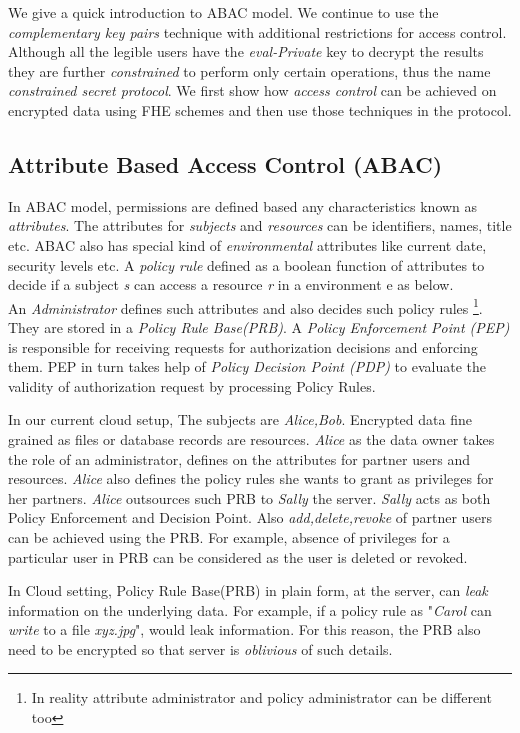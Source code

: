 \documentclass[conference]{IEEEtran}
\numberwithin{equation}{section}
\begin{document}
We give a quick introduction to ABAC model. We continue to use the \emph{complementary key pairs} technique with additional restrictions for access control. Although all the legible users have the \emph{eval-Private} key to decrypt the results they are further \emph{constrained} to perform only certain operations, thus the name \emph{constrained secret protocol}. We first show how \emph{access control} can be achieved on encrypted data using FHE schemes and then use those techniques in the protocol.
\subsection{Attribute Based Access Control (ABAC)}

In ABAC model, permissions are defined based any characteristics known as \emph{attributes}. The attributes for \emph{subjects} and \emph{resources} can be identifiers, names, title etc. ABAC also has special kind of \emph{environmental} attributes like current date, security levels etc.  A \emph{policy rule} defined as a boolean function of attributes to decide if a subject \emph{s} can access a resource \emph{r} in a environment {e} as below. \\


An \emph{Administrator} defines such attributes and also decides such policy rules \footnote{In reality attribute administrator and policy administrator can be different too}. They are stored in a \emph{Policy Rule Base(PRB)}. A \emph{Policy Enforcement Point (PEP)} is responsible for receiving requests for authorization decisions and enforcing them. PEP in turn takes help of \emph{Policy Decision Point (PDP)} to evaluate the validity of authorization request by processing Policy Rules.

In our current cloud setup, The subjects are \emph{Alice,Bob}. Encrypted data fine grained as files or database records are resources. \emph{Alice} as the data owner takes the role of an administrator, defines on the attributes for partner users and resources. \emph{Alice} also defines the policy rules she wants to grant as privileges for her partners. \emph{Alice} outsources such PRB to \emph{Sally} the server. \emph{Sally} acts as both Policy Enforcement and Decision Point. Also \emph{add,delete,revoke} of partner users can be achieved using the PRB. For example, absence of privileges for a particular user in PRB can be considered as the user is deleted or revoked.

In Cloud setting, Policy Rule Base(PRB) in plain form, at the server, can \emph{leak} information on the underlying data. For example, if a policy rule as "\emph{Carol} can \emph{write} to a file \emph{xyz.jpg}", would leak information. For this reason, the PRB also need to be encrypted so that server is \emph{oblivious} of such details.
\end{document}
